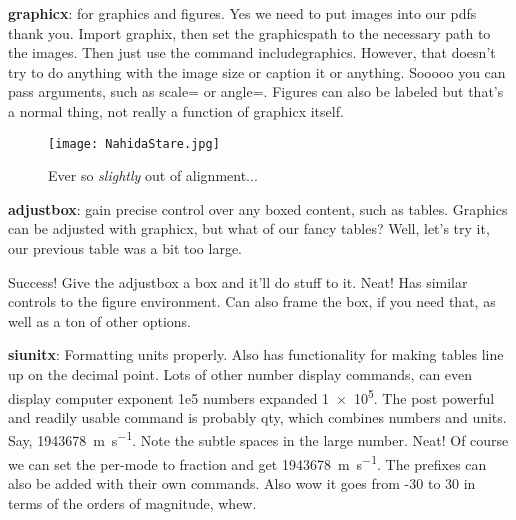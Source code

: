 \documentclass{article}
\begin{document}
\textbf{graphicx}: for graphics and figures. Yes we need to put images into our pdfs thank you. Import graphix, then set the graphicspath to the necessary path to the images. Then just use the command includegraphics. However, that doesn't try to do anything with the image size or caption it or anything. Sooooo you can pass arguments, such as scale= or angle=. Figures can also be labeled but that's a normal thing, not really a function of graphicx itself.

\begin{figure}[htb]
\texttt{[image: NahidaStare.jpg]}
\centering
\caption{Ever so \emph{slightly} out of alignment...}
\end{figure}

\textbf{adjustbox}: gain precise control over any boxed content, such as tables. Graphics can be adjusted with graphicx, but what of our fancy tables? Well, let's try it, our previous table was a bit too large.


Success! Give the adjustbox a box and it'll do stuff to it. Neat! Has similar controls to the figure environment. Can also frame the box, if you need that, as well as a ton of other options.

\textbf{siunitx}: Formatting units properly. Also has functionality for making tables line up on the decimal point. Lots of other number display commands, can even display computer exponent 1e5 numbers expanded \num{1e5}. The post powerful and readily usable command is probably qty, which combines numbers and units. Say, \qty{1943678}{\meter\per\second}. Note the subtle spaces in the large number. Neat! Of course we can set the per-mode to fraction and get \qty[per-mode = fraction]{1943678}{\meter\per\second}. The prefixes can also be added with their own commands. Also wow it goes from -30 to 30 in terms of the orders of magnitude, whew.
\end{document}
